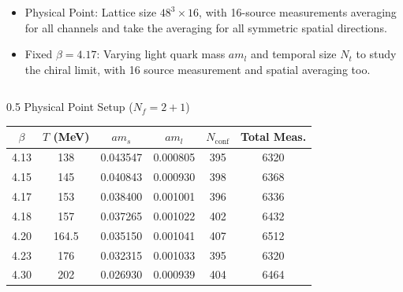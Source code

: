 \documentclass[10pt, aspectratio=169]{beamer} %
\begin{document}
\begin{frame}
\vfill
{}
\fontsize{9pt}{11pt}\selectfont
\begin{itemize}
    \item Physical Point: Lattice size $48^3 \times 16$, with 16-source measurements averaging for all channels and take the averaging for all symmetric spatial directions.
    \item Fixed $\beta = 4.17$: Varying light quark mass $am_l$ and temporal size $N_t$ to study the chiral limit, with 16 source measurement and spatial averaging too.
\end{itemize}

\vspace{0.5em}

\begin{columns}[c]
    \begin{column}{0.5\textwidth}
        \centering
        {\footnotesize Physical Point Setup ($N_f = 2+1$)} \\
        \vspace{0.3em}
        \tiny
        \renewcommand{\arraystretch}{1.1}
        \setlength{\tabcolsep}{3.5pt}
        \begin{tabular}{cccccc}
            \toprule
            $\beta$ & $T$ (MeV) & $am_s$ & $am_l$ & $N_{\mathrm{conf}}$ & Total Meas. \\
            \midrule
            4.13 & 138   & 0.043547 & 0.000805 & 395 & 6320 \\
            4.15 & 145   & 0.040843 & 0.000930 & 398 & 6368 \\
            4.17 & 153   & 0.038400 & 0.001001 & 396 & 6336 \\
            4.18 & 157   & 0.037265 & 0.001022 & 402 & 6432 \\
            4.20 & 164.5 & 0.035150 & 0.001041 & 407 & 6512 \\
            4.23 & 176   & 0.032315 & 0.001033 & 395 & 6320 \\
            4.30 & 202   & 0.026930 & 0.000939 & 404 & 6464 \\
            \bottomrule
        \end{tabular}
    \end{column}


\end{columns}
\end{frame}
\end{document}

